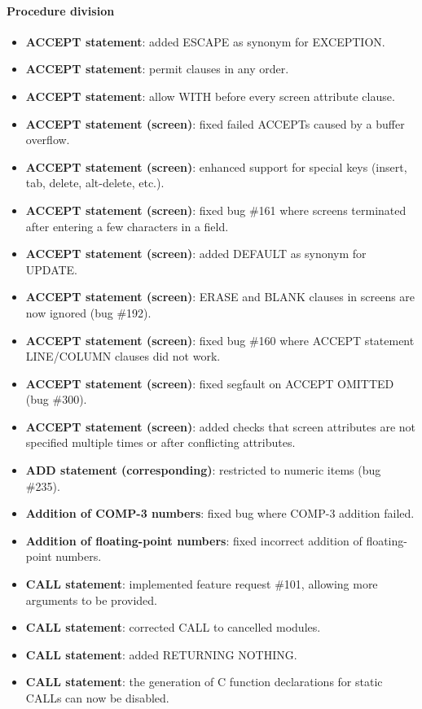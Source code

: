 \paragraph{Procedure division}
\begin{itemize}
\item \textbf{ACCEPT statement}: added ESCAPE as synonym for EXCEPTION.
\item \textbf{ACCEPT statement}: permit clauses in any order.
\item \textbf{ACCEPT statement}: allow WITH before every screen attribute clause.
\item \textbf{ACCEPT statement (screen)}: fixed failed ACCEPTs caused by a buffer overflow.
\item \textbf{ACCEPT statement (screen)}: enhanced support for special keys (insert, tab, delete, alt-delete, etc.).
\item \textbf{ACCEPT statement (screen)}: fixed bug \#161 where screens terminated after entering a few characters in a field.
\item \textbf{ACCEPT statement (screen)}: added DEFAULT as synonym for UPDATE.
\item \textbf{ACCEPT statement (screen)}: ERASE and BLANK clauses in screens are now ignored (bug \#192).
\item \textbf{ACCEPT statement (screen)}: fixed bug \#160 where ACCEPT statement LINE\slash{}COLUMN clauses did not work.
\item \textbf{ACCEPT statement (screen)}: fixed segfault on ACCEPT OMITTED (bug \#300).
\item \textbf{ACCEPT statement (screen)}: added checks that screen attributes are not specified multiple times or after conflicting attributes.
\item \textbf{ADD statement (corresponding)}: restricted to numeric items (bug \#235).
\item \textbf{Addition of COMP-3 numbers}: fixed bug where COMP-3 addition failed.
\item \textbf{Addition of floating-point numbers}: fixed incorrect addition of floating-point numbers.
\item \textbf{CALL statement}: implemented feature request \#101, allowing more arguments to be provided.
\item \textbf{CALL statement}: corrected CALL to cancelled modules.
\item \textbf{CALL statement}: added RETURNING NOTHING.
\item \textbf{CALL statement}: the generation of C function declarations for static CALLs can now be disabled.

\end{itemize}
